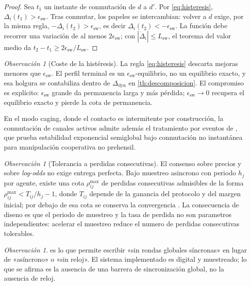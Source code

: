 \documentclass[11pt,a4paper]{article}
\theoremstyle{plain}
\theoremstyle{definition}
\theoremstyle{remark}
\newtheorem{observacion}[teorema]{Observación}
\begin{document}
\begin{proof}
Sea $t_1$ un instante de conmutación de $d$ a $d'$. Por \eqref{eq:histeresis},
$\Delta_i(t_1)>\epsilon_{\mathrm{sw}}$. Tras conmutar, los papeles se
intercambian: volver a $d$ exige, por la misma regla,
$-\Delta_i(t_2)>\epsilon_{\mathrm{sw}}$, es decir
$\Delta_i(t_2)<-\epsilon_{\mathrm{sw}}$. La función debe recorrer una variación
de al menos $2\epsilon_{\mathrm{sw}}$; con $|\dot\Delta_i|\le L_{\mathrm{sw}}$,
el teorema del valor medio da
$t_2-t_1\ge 2\epsilon_{\mathrm{sw}}/L_{\mathrm{sw}}$.
\end{proof}

\begin{observacion}[Coste de la histéresis]
La regla \eqref{eq:histeresis} descarta mejoras menores que
$\epsilon_{\mathrm{sw}}$. El perfil terminal es un
$\epsilon_{\mathrm{sw}}$-equilibrio, no un equilibrio exacto, y esa holgura se
contabiliza dentro de $\Delta_{\mathrm{dyn}}$ en \cref{th:descomposicion}. El
compromiso es explícito: $\epsilon_{\mathrm{sw}}$ grande da permanencia larga y
más pérdida; $\epsilon_{\mathrm{sw}}\to0$ recupera el equilibrio exacto y pierde
la cota de permanencia.
\end{observacion}

En el modo \textsf{caging}, donde el contacto es intermitente por construcción,
la conmutación de canales activos admite además el tratamiento por eventos de
\cite{lee2026switching}, que prueba estabilidad exponencial semiglobal bajo
conmutación no instantánea para manipulación cooperativa no prehensil.

\begin{observacion}[Tolerancia a perdidas consecutivas]
\label{obs:perdidas}
El consenso sobre precios y sobre \emph{log-odds} no exige entrega perfecta.
Bajo muestreo asincrono con periodo $h_j$ por agente, existe una cota
$\rho^{\max}_{ij}$ de perdidas consecutivas admisibles de la forma
$\rho^{\max}_{ij}<T_{ij}/h_j-1$, donde $T_{ij}$ depende de la ganancia del
protocolo y del margen inicial; por debajo de esa cota se conserva la
convergencia \cite{zhao2024hybrid}. La consecuencia de diseno es que el periodo
de muestreo y la tasa de perdida no son parametros independientes: acelerar el
muestreo reduce el numero de perdidas consecutivas tolerables.
\end{observacion}

\begin{observacion}
 es lo que permite escribir «sin rondas globales
síncronas» en lugar de «asíncrono» o «sin reloj». El sistema implementado es
digital y muestreado; lo que se afirma es la ausencia de una barrera de
sincronización global, no la ausencia de reloj.
\end{observacion}
\end{document}
